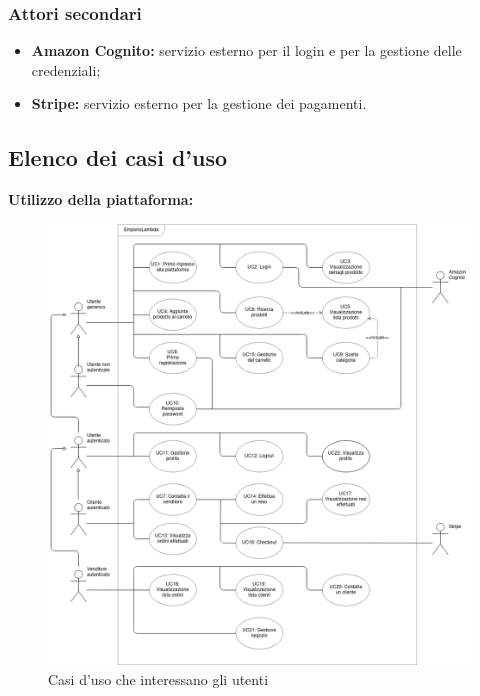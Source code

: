 \begin{itemize}
\begin{itemize}
\begin{figure}[!ht]
                            \centering
                        \end{figure}
                \end{itemize}
        \end{itemize}
        \subsubsection{Attori secondari}
        \begin{itemize}
            \item \textbf{Amazon Cognito:} servizio esterno per il login e per la gestione delle credenziali;
            \item \textbf{Stripe:} servizio esterno per la gestione dei pagamenti.
        \end{itemize}
        \newpage
    \subsection{Elenco dei casi d'uso}
        \textbf{Utilizzo della piattaforma:}
        \begin{figure}[!ht]
            \caption{Casi d'uso che interessano gli utenti}
            \vspace{10px}
            \includegraphics[scale=0.44]{../../../Images/AnalisiRequisiti/casiUso}
            \centering
        \end{figure}
